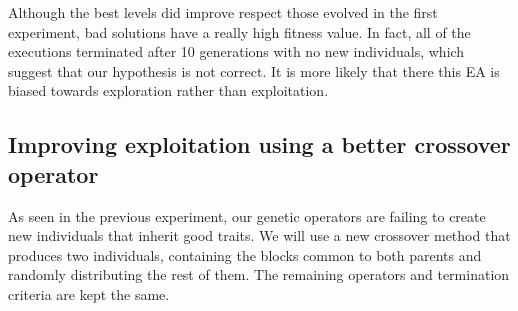 \documentclass[sigconf]{acmart}
\begin{document}
Although the best levels did improve respect those 
evolved in the first experiment, bad solutions have a really high fitness 
value. 
In fact, all of the executions terminated after 10 generations with no new individuals,
which suggest that our hypothesis %
is not correct. It is more likely that there this EA is biased towards 
exploration rather than exploitation. 
\subsection{Improving exploitation using a better crossover operator}\label{E3}
As seen in the previous experiment, our genetic operators are failing to 
create new individuals that inherit good traits.
We will use a new crossover method that produces two 
individuals, containing the blocks common to both parents and randomly
distributing the rest of them.
The remaining operators and termination criteria are kept the same. 
\end{document}
